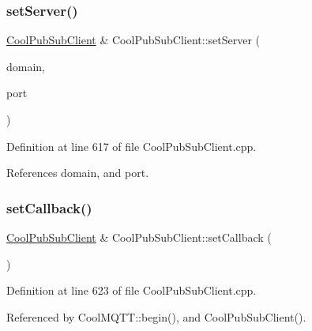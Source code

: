 \subsubsection{\texorpdfstring{set\+Server()}{setServer()}\hspace{0.1cm}{\footnotesize\ttfamily [3/3]}}
{\footnotesize\ttfamily \hyperlink{class_cool_pub_sub_client}{Cool\+Pub\+Sub\+Client} \& Cool\+Pub\+Sub\+Client\+::set\+Server (\begin{DoxyParamCaption}\item[{const char $\ast$}]{domain,  }\item[{uint16\+\_\+t}]{port }\end{DoxyParamCaption})}



Definition at line 617 of file Cool\+Pub\+Sub\+Client.\+cpp.



References domain, and port.

\mbox{\label{class_cool_pub_sub_client_ac5cab7658f1bdded32131241e468e661}} 
\subsubsection{\texorpdfstring{set\+Callback()}{setCallback()}}
{\footnotesize\ttfamily \hyperlink{class_cool_pub_sub_client}{Cool\+Pub\+Sub\+Client} \& Cool\+Pub\+Sub\+Client\+::set\+Callback (\begin{DoxyParamCaption}\item[{\hyperlink{class_cool_pub_sub_client_a021ec75e9fbaf658370b8005ccfddc14}{M\+Q\+T\+T\+\_\+\+C\+A\+L\+L\+B\+A\+C\+K\+\_\+\+S\+I\+G\+N\+A\+T\+U\+RE}}]{ }\end{DoxyParamCaption})}



Definition at line 623 of file Cool\+Pub\+Sub\+Client.\+cpp.



Referenced by Cool\+M\+Q\+T\+T\+::begin(), and Cool\+Pub\+Sub\+Client().

